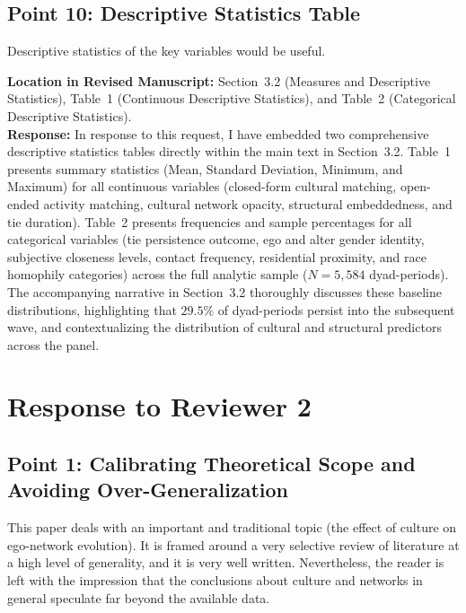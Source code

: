 \documentclass[11pt]{article}
\begin{document}
\subsection*{Point 10: Descriptive Statistics Table}

\begin{reviewercomment}
Descriptive statistics of the key variables would be useful.
\end{reviewercomment}

\noindent\textbf{Location in Revised Manuscript:} Section~3.2 (Measures and Descriptive Statistics), Table~1 (Continuous Descriptive Statistics), and Table~2 (Categorical Descriptive Statistics).\\[4pt]
\textbf{Response:} In response to this request, I have embedded two comprehensive descriptive statistics tables directly within the main text in Section~3.2. Table~1 presents summary statistics (Mean, Standard Deviation, Minimum, and Maximum) for all continuous variables (closed-form cultural matching, open-ended activity matching, cultural network opacity, structural embeddedness, and tie duration). Table~2 presents frequencies and sample percentages for all categorical variables (tie persistence outcome, ego and alter gender identity, subjective closeness levels, contact frequency, residential proximity, and race homophily categories) across the full analytic sample ($N = 5,584$ dyad-periods). The accompanying narrative in Section~3.2 thoroughly discusses these baseline distributions, highlighting that $29.5\%$ of dyad-periods persist into the subsequent wave, and contextualizing the distribution of cultural and structural predictors across the panel.

\clearpage

\section*{Response to Reviewer 2}

\subsection*{Point 1: Calibrating Theoretical Scope and Avoiding Over-Generalization}

\begin{reviewercomment}
This paper deals with an important and traditional topic (the effect of culture on ego-network evolution). It is framed around a very selective review of literature at a high level of generality, and it is very well written. Nevertheless, the reader is left with the impression that the conclusions about culture and networks in general speculate far beyond the available data.
\end{reviewercomment}
\end{document}
